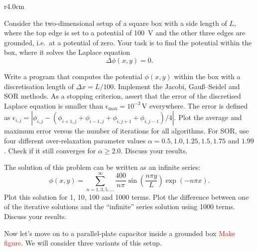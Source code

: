 \documentclass{../project}
\begin{document}
\begin{sheet}[title={Project 4: Partial differential equations (PDEs)}, number=4, due={December 20th, 10am}]
\begin{problem}[title={Laplace equation}, label=laplace]
\begin{wrapfigure}{r}{4.0cm}
\begin{center}
    \end{center}
\end{wrapfigure} 

  Consider the two-dimensional setup of a square box
  with a side length of $L$, where the top edge
  is set to a potential of \SI{100}{\volt}
  and the other three edges are grounded, i.e.\ at a potential of zero.
  Your task is to find the potential within the box,
  where it solves the Laplace equation
  \begin{equation}
    \Delta \phi(x,y) = 0.
  \end{equation}

  \begin{subproblem}[label=laplace:a,points=6]
    Write a program that computes the potential $\phi(x,y)$
    within the box with a discretisation length of $\Delta x = L/100$.
    Implement the Jacobi, Gauß--Seidel and SOR methods.
    As a stopping criterion, assert that the error
    of the discretised Laplace equation
    is smaller than $\epsilon_\text{max}=10^{-3}\,\text{V}$ everywhere.
    The error is defined as
    $\epsilon_{i,j} = |\phi_{i,j} - (\phi_{i+1,j} + \phi_{i-1,j} + \phi_{i,j+1} + \phi_{i,j-1})/4|$.
    Plot the average and maximum error versus the number of iterations
    for all algorithms.
    For SOR, use four different over-relaxation parameter values $\alpha=0.5, 1.0, 1.25, 1.5, 1.75$ and $1.99$.
    Check if it still converges for $\alpha \geq 2.0$.
    Discuss your results.
  \end{subproblem}

  \begin{subproblem}[label=laplace:c,points=4]
    The solution of this problem can be written
    as an infinite series:
    \begin{equation}
      \phi(x,y) = \sum_{n=1,3,5,\ldots}^{\infty}
      \frac{400}{n\pi}
      \sin\left(\frac{n \pi y}{L}\right)
      \exp(-n \pi x).
    \end{equation}
    Plot this solution for 1, 10, 100 and 1000 terms.
    Plot the difference between one of the iterative solutions
    and the ``infinite'' series solution using 1000 terms.
    Discuss your results.
  \end{subproblem}

  \iffalse

  Now let's move on to a parallel-plate capacitor inside a grounded box
  \textcolor{red}{Make figure}.
  We will consider three variants of this setup.


\end{problem}
\end{sheet}
\end{document}
